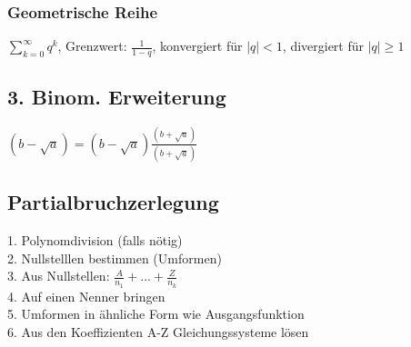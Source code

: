\documentclass[a4paper, 8pt]{extarticle} %
\begin{document}
\begin{multicols*}{4}
\subsubsection*{Geometrische Reihe}
$\sum_{k = 0}^\infty q^k$, Grenzwert: $\frac{1}{1-q}$, konvergiert für $|q|< 1$, divergiert für $|q| \geq 1$
\subsection*{3. Binom. Erweiterung}
$(b - \sqrt{a}) = (b - \sqrt{a}) \frac{(b + \sqrt{a})}{(b + \sqrt{a})}$

\subsection*{Partialbruchzerlegung}
1. Polynomdivision (falls nötig)\\
2. Nullstelllen bestimmen (Umformen)\\
3. Aus Nullstellen: $\frac{A}{n_1} + ... + \frac{Z}{n_k}$\\
4. Auf einen Nenner bringen\\
5. Umformen in ähnliche Form wie Ausgangsfunktion\\
6. Aus den Koeffizienten A-Z Gleichungssysteme lösen
\end{multicols*}
\end{document}
